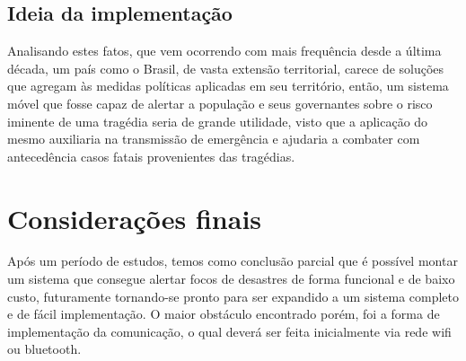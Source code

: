 \documentclass[conference]{IEEEtran}
\begin{document}
\subsection{Ideia da implementação}

Analisando estes fatos, que vem ocorrendo com mais frequência desde a última década, um país como o Brasil, de vasta extensão territorial, carece de soluções que agregam às medidas políticas aplicadas em seu território, então, um sistema móvel que fosse capaz de alertar a população e seus governantes sobre o risco iminente de uma tragédia seria de grande utilidade, visto que a aplicação do mesmo auxiliaria na transmissão de emergência e ajudaria a combater com antecedência casos fatais provenientes das tragédias.

\section{Considerações finais}

Após um período de estudos, temos como conclusão parcial que é possível montar um sistema que consegue alertar focos de desastres de forma funcional e de baixo custo, futuramente tornando-se pronto para ser expandido a um sistema completo e de fácil implementação. O maior obstáculo encontrado porém, foi a forma de implementação da comunicação, o qual deverá ser feita inicialmente via rede wifi ou bluetooth.

\end{document}
